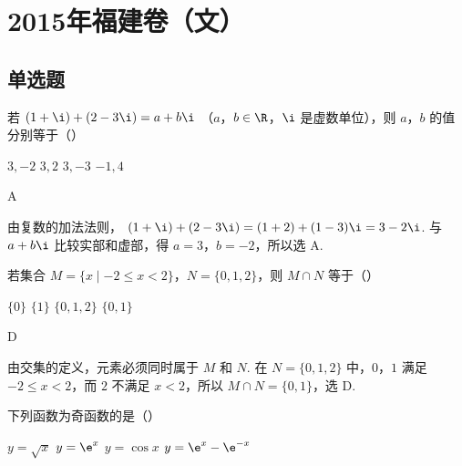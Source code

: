 
\chapter{2015年福建卷（文）}

\section{单选题}

\begin{problem}
若 \((1+\i) + (2 - 3\i) = a + b\i\) （\(a\)，\(b\in \R\)，\(\i\) 是虚数单位），则 \(a\)，\(b\) 的值分别等于（\quad）

\choices
    {\(3,-2\)}
    {\(3,2\)}
    {\(3,-3\)}
    {\(-1,4\)}
\end{problem}

\begin{answer}
A
\end{answer}

\begin{solution}
由复数的加法法则，
\( (1+\i)+(2-3\i)=(1+2)+(1-3)\i=3-2\i \). 与 \(a+b\i\) 比较实部和虚部，得 \(a=3\)，\(b=-2\)，所以选 A.
\end{solution}

\begin{problem}
若集合 \(M = \{x \mid -2 \leqslant x < 2\}\)，\(N = \{0, 1, 2\}\)，则 \(M \cap N\) 等于（\quad）

\choices
    {\(\{0\}\)}
    {\(\{1\}\)}
    {\(\{0, 1, 2\}\)}
    {\(\{0, 1\}\)}
\end{problem}

\begin{answer}
D
\end{answer}

\begin{solution}
由交集的定义，元素必须同时属于 \(M\) 和 \(N\). 在 \(N=\{0,1,2\}\) 中，\(0\)，\(1\) 满足 \(-2\leqslant x<2\)，而 \(2\) 不满足 \(x<2\)，所以 \(M\cap N=\{0,1\}\)，选 D.
\end{solution}

\begin{problem}
下列函数为奇函数的是（\quad）

\choices
    {\(y = \sqrt{x}\)}
    {\(y = \e^{x}\)}
    {\(y = \cos x\)}
    {\(y = \e^{x} - \e^{-x}\)}
\end{problem}

